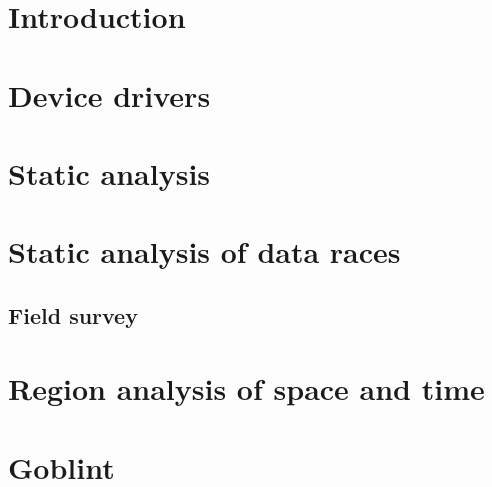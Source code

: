 \documentclass{style/master-thesis}
\begin{document}
\tableofcontents



\section{Introduction}


\pagebreak

\section{Device drivers}
\label{sec:device-drivers}


\pagebreak


\section{Static analysis}
\label{sec:static-analysis}


\pagebreak

\section{Static analysis of data races}
\label{sec:data-races}


\subsection{Field survey}


\pagebreak


%

\section{Region analysis of space and time}
\label{sec:region}


\pagebreak


\section{Goblint}
\label{sec:goblint}
%

\end{document}
